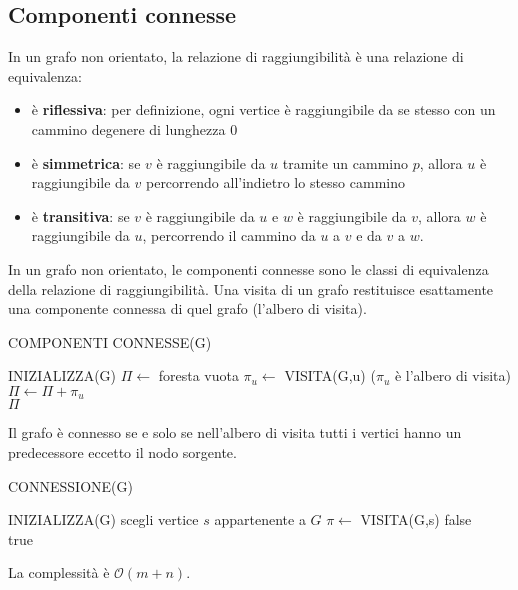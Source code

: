 \documentclass[11pt]{article}
\begin{document}
\subsection{Componenti connesse}
In un grafo non orientato, la relazione di raggiungibilità è una relazione di equivalenza:
\begin{itemize}
    \item è \textbf{riflessiva}: per definizione, ogni vertice è raggiungibile da se stesso con un cammino degenere di 
    lunghezza 0
    \item è \textbf{simmetrica}: se $v$ è raggiungibile da $u$ tramite un cammino $p$, allora $u$ è raggiungibile da $v$ 
    percorrendo all'indietro lo stesso cammino
    \item è \textbf{transitiva}: se $v$ è raggiungibile da $u$ e $w$ è raggiungibile da $v$, allora $w$ è raggiungibile 
    da $u$, percorrendo il cammino da $u$ a $v$ e da $v$ a $w$.
\end{itemize}
In un grafo non orientato, le componenti connesse sono le classi di equivalenza della relazione di raggiungibilità. Una 
visita di un grafo restituisce esattamente una componente connessa di quel grafo (l'albero di visita).
\begin{algorithm}[H]
    \caption{COMPONENTI CONNESSE(G)}
    \begin{algorithmic}
        \State INIZIALIZZA(G)
        \State $\Pi \gets$ foresta vuota 
                \State $\pi_u \gets$ VISITA(G,u) ($\pi_u$ è l'albero di visita)
                \State $\Pi \gets \Pi+{\pi_u}$
            \EndIf 
        \EndFor\\
        \Return $\Pi$
    \end{algorithmic}
\end{algorithm}
Il grafo è connesso se e solo se nell'albero di visita tutti i vertici hanno un predecessore eccetto il nodo sorgente.
\begin{algorithm}
    \caption{CONNESSIONE(G)}
    \begin{algorithmic}
        \State INIZIALIZZA(G)
        \State scegli vertice $s$ appartenente a $G$
        \State $\pi \gets$ VISITA(G,s)
            \Return false 
            \EndIf
        \EndFor\\ 
        \Return true
    \end{algorithmic}
\end{algorithm}
La complessità è $\mathcal{O}(m+n)$.
\end{document}
